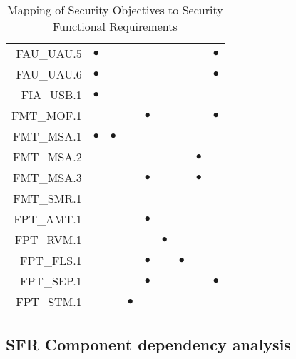 \documentclass[12pt,english]{scrbook}
\newcommand{\oh}{$\bullet$}
\begin{document}
\begin{table}
\begin{tabular}{rRRRRRRRR}
FAU\_UAU.5                  & \oh  &              &         &           &          &             &              & \oh          \\
FAU\_UAU.6                  & \oh  &              &         &           &          &             &              & \oh          \\
FIA\_USB.1                  & \oh  &              &         &           &          &             &              &              \\
FMT\_MOF.1                  &      &              &         &  \oh      &          &             &              & \oh          \\
FMT\_MSA.1                  & \oh  &  \oh         &         &           &          &             &              &              \\
FMT\_MSA.2                  &      &              &         &           &          &             &  \oh         &              \\  
FMT\_MSA.3                  &      &              &         & \oh       &          &             &  \oh         &              \\
FMT\_SMR.1                  &      &              &         &           &          &             &              &              \\
FPT\_AMT.1                  &      &              &         & \oh       &          &             &              &              \\
FPT\_RVM.1                  &      &              &         &           &  \oh     &             &              &              \\
FPT\_FLS.1                  &      &              &         &  \oh      &          &   \oh       &              &              \\
FPT\_SEP.1                  &      &              &         &   \oh     &          &             &              &   \oh        \\
FPT\_STM.1                  &      &              &  \oh    &           &          &             &              &              \\
 \bottomrule
 \end{tabular}
 \caption{Mapping of Security Objectives to Security Functional Requirements}
\end{table}

\subsection{SFR Component dependency analysis}
\end{document}
